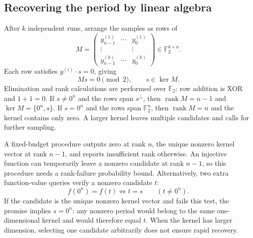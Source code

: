 \documentclass[11pt,oneside,openany]{book}
\newcommand{\Ftwo}{\mathbb F_2}
\DeclareMathOperator{\rank}{rank}
\theoremstyle{definition}
\begin{document}
\subsection{Recovering the period by linear algebra}
After $k$ independent runs, arrange the samples as rows of
\begin{equation}
 M=\begin{pmatrix}
 y^{(1)}_{n-1}&\cdots&y^{(1)}_0\\
 \vdots&&\vdots\\
 y^{(k)}_{n-1}&\cdots&y^{(k)}_0
 \end{pmatrix}\in\Ftwo^{k\times n}.
\end{equation}
Each row satisfies $y^{(i)}\cdot s=0$, giving
\begin{equation}
 Ms=0\pmod2,\qquad s\in\ker M.
 \label{eq:simon-linear-system}
\end{equation}
Elimination and rank calculations are performed over $\Ftwo$: row addition is XOR and $1+1=0$. If $s\ne0^n$ and the rows span $s^\perp$, then $\rank M=n-1$ and $\ker M=\{0^n,s\}$. If $s=0^n$ and the rows span $\Ftwo^n$, then $\rank M=n$ and the kernel contains only zero. A larger kernel leaves multiple candidates and calls for further sampling.

A fixed-budget procedure outputs zero at rank $n$, the unique nonzero kernel vector at rank $n-1$, and reports insufficient rank otherwise. An injective function can temporarily leave a nonzero candidate at rank $n-1$, so this procedure needs a rank-failure probability bound. Alternatively, two extra function-value queries verify a nonzero candidate $t$:
\begin{equation}
 f(0^n)=f(t)\iff t=s\qquad(t\ne0^n).
\end{equation}
If the candidate is the unique nonzero kernel vector and fails this test, the promise implies $s=0^n$: any nonzero period would belong to the same one-dimensional kernel and would therefore equal $t$. When the kernel has larger dimension, selecting one candidate arbitrarily does not ensure rapid recovery.
\end{document}
